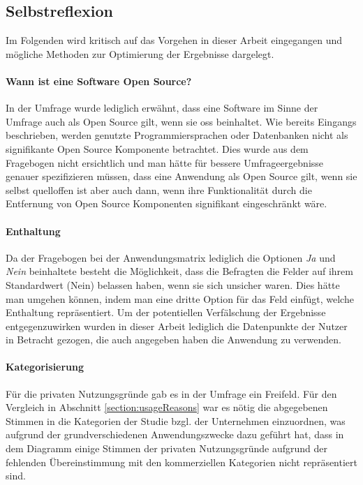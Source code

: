 \documentclass[a4paper]{article}
\begin{document}
        \subsection{Selbstreflexion}
            Im Folgenden wird kritisch auf das Vorgehen in dieser Arbeit eingegangen und mögliche Methoden zur Optimierung der Ergebnisse dargelegt.
            \paragraph{Wann ist eine Software Open Source?}
                In der Umfrage wurde lediglich erwähnt, dass eine Software im Sinne der Umfrage auch als Open Source gilt, wenn sie \gls{oss} beinhaltet. Wie bereits Eingangs beschrieben, werden genutzte Programmiersprachen oder Datenbanken nicht als signifikante Open Source Komponente betrachtet. Dies wurde aus dem Fragebogen nicht ersichtlich und man hätte für bessere Umfrageergebnisse genauer spezifizieren müssen, dass eine Anwendung als Open Source gilt, wenn sie selbst quelloffen ist aber auch dann, wenn ihre Funktionalität durch die Entfernung von Open Source Komponenten signifikant eingeschränkt wäre.
                
            \paragraph{Enthaltung}
                Da der Fragebogen bei der Anwendungsmatrix lediglich die Optionen \emph{Ja} und \emph{Nein} beinhaltete besteht die Möglichkeit, dass die Befragten die Felder auf ihrem Standardwert ({\scriptsize Nein}) belassen haben, wenn sie sich unsicher waren. Dies hätte man umgehen können, indem man eine dritte Option für das Feld einfügt, welche Enthaltung repräsentiert. Um der potentiellen Verfälschung der Ergebnisse entgegenzuwirken wurden in dieser Arbeit lediglich die Datenpunkte der Nutzer in Betracht gezogen, die auch angegeben haben die Anwendung zu verwenden.
                
            \paragraph{Kategorisierung}
                Für die privaten Nutzungsgründe gab es in der Umfrage ein Freifeld. Für den Vergleich in Abschnitt \ref{section:usageReasons} war es nötig die abgegebenen Stimmen in die Kategorien der Studie bzgl. der Unternehmen einzuordnen, was aufgrund der grundverschiedenen Anwendungszwecke dazu geführt hat, dass in dem Diagramm einige Stimmen der privaten Nutzungsgründe aufgrund der fehlenden Übereinstimmung mit den kommerziellen Kategorien nicht repräsentiert sind.
                
\end{document}
